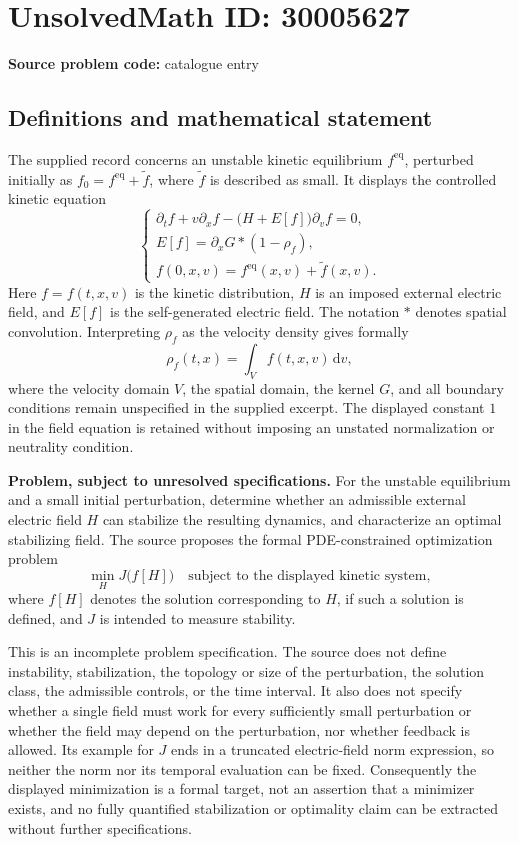 \documentclass[11pt]{article}
\begin{document}
\section*{UnsolvedMath ID: 30005627}
\textbf{Source problem code:} catalogue entry
\subsection{Definitions and mathematical statement}
The supplied record concerns an unstable kinetic equilibrium \(f^{\mathrm{eq}}\), perturbed initially as \(f_0=f^{\mathrm{eq}}+\widetilde f\), where \(\widetilde f\) is described as small. It displays the controlled kinetic equation
\[
\begin{cases}
\partial_t f+v\partial_x f-\bigl(H+E[f]\bigr)\partial_v f=0,\\
E[f]=\partial_xG*(1-\rho_f),\\
f(0,x,v)=f^{\mathrm{eq}}(x,v)+\widetilde f(x,v).
\end{cases}
\]
Here \(f=f(t,x,v)\) is the kinetic distribution, \(H\) is an imposed external electric field, and \(E[f]\) is the self-generated electric field. The notation \(*\) denotes spatial convolution. Interpreting \(\rho_f\) as the velocity density gives formally
\[
\rho_f(t,x)=\int_V f(t,x,v)\,\mathrm{d}v,
\]
where the velocity domain \(V\), the spatial domain, the kernel \(G\), and all boundary conditions remain unspecified in the supplied excerpt. The displayed constant \(1\) in the field equation is retained without imposing an unstated normalization or neutrality condition.

\textbf{Problem, subject to unresolved specifications.} For the unstable equilibrium and a small initial perturbation, determine whether an admissible external electric field \(H\) can stabilize the resulting dynamics, and characterize an optimal stabilizing field. The source proposes the formal PDE-constrained optimization problem
\[
\min_H J\bigl(f[H]\bigr)
\quad\text{subject to the displayed kinetic system},
\]
where \(f[H]\) denotes the solution corresponding to \(H\), if such a solution is defined, and \(J\) is intended to measure stability.

This is an incomplete problem specification. The source does not define instability, stabilization, the topology or size of the perturbation, the solution class, the admissible controls, or the time interval. It also does not specify whether a single field must work for every sufficiently small perturbation or whether the field may depend on the perturbation, nor whether feedback is allowed. Its example for \(J\) ends in a truncated electric-field norm expression, so neither the norm nor its temporal evaluation can be fixed. Consequently the displayed minimization is a formal target, not an assertion that a minimizer exists, and no fully quantified stabilization or optimality claim can be extracted without further specifications.
\end{document}
